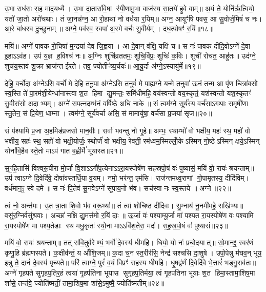 उ॒भा राध॑सः स॒ह मा॑द॒यध्यै। उ॒भा दा॒तारा॑वि॒षा र॑यी॒णामु॒भा वाज॑स्य सा॒तये॑ हुवे वाम्॥ अ॒यं ते॒ योनि॑र्\mbox{}ऋ॒त्वियो॒ यतो॑ जा॒तो अरो॑चथाः। तं जा॒नन्न॑ग्न॒ आ रो॒हाथा॑ नो वर्धया र॒यिम्॥ अग्न॒ आयूꣳ॑षि पवस॒ आ सु॒वोर्ज॒मिषं॑ च नः। आ॒रे बा॑धस्व दु॒च्छुनाम्॥ अग्ने॒ पव॑स्व॒ स्वपा॑ अ॒स्मे वर्चः॑ सु॒वीर्यम्। दध॒त्पोषꣳ॑ र॒यिं॥१८॥

मयि॑॥ अग्ने॑ पावक रो॒चिषा॑ म॒न्द्रया॑ देव जि॒ह्वया। आ दे॒वान् व॑क्षि॒ यक्षि॑ च॥ स नः॑ पावक दीदि॒वोऽग्ने॑ दे॒वा इ॒हाऽऽव॑ह। उप॑ य॒ज्ञ ह॒विश्च॑ नः॥ अ॒ग्निः शुचि॑व्रततमः॒ शुचि॒र्विप्रः॒ शुचिः॑ क॒विः। शुची॑ रोचत॒ आहु॑तः॥ उद॑ग्ने॒ शुच॑य॒स्तव॑ शु॒क्रा भ्राज॑न्त ईरते। तव॒ ज्योतीꣳ॑ष्य॒र्चयः॑॥ आ॒यु॒र्दा अ॑ग्ने॒ऽस्यायु॑र्मे॥१९॥

दे॒हि॒ व॒र्चो॒दा अ॑ग्नेऽसि॒ वर्चो॑ मे देहि तनू॒पा अ॑ग्नेऽसि त॒नुवं॑ मे पा॒ह्यग्ने॒ यन्मे॑ त॒नुवा॑ ऊ॒नं तन्म॒ आ पृ॑ण॒ चित्रा॑वसो स्व॒स्ति ते॑ पा॒रम॑शी॒येन्धा॑नास्त्वा श॒त हिमा द्यु॒मन्तः॒ समि॑धीमहि॒ वय॑स्वन्तो वय॒स्कृतं॒ यश॑स्वन्तो यश॒स्कृतꣳ॑ सु॒वीरा॑सो॒ अदाभ्यम्। अग्ने॑ सपत्न॒दम्भ॑नं॒ वर्\mbox{}षि॑ष्ठे॒ अधि॒ नाके॥ सं त्वम॑ग्ने॒ सूर्य॑स्य॒ वर्च॑साऽगथाः॒ समृषी॑णा स्तु॒तेन॒ सं प्रि॒येण॒ धाम्ना। त्वम॑ग्ने॒ सूर्य॑वर्चा असि॒ सं मामायु॑षा॒ वर्च॑सा प्र॒जया॑ सृज॥२०॥

{\anuvakamend[{आ॒हु॒वध्यै॑ र॒यिं मे॒ वर्च॑सा स॒प्तद॑श च॥५॥}]}

सं प॑श्यामि प्र॒जा अ॒हमिड॑प्रजसो मान॒वीः। सर्वा॑ भवन्तु नो गृ॒हे॥ अम्भः॒ स्थाम्भो॑ वो भक्षीय॒ महः॑ स्थ॒ महो॑ वो भक्षीय॒ सहः॑ स्थ॒ सहो॑ वो भक्षी॒योर्जः॒ स्थोर्जं॑ वो भक्षीय॒ रेव॑ती॒ रम॑ध्वम॒स्मिल्लोँ॒केऽस्मिन् गो॒ष्ठेऽस्मिन् क्षये॒ऽस्मिन् योना॑वि॒हैव स्ते॒तो माऽप॑ गात ब॒ह्वीर्मे॑ भूयास्त॥२१॥

स॒ꣳ॒हि॒तासि॑ विश्वरू॒पीरा मो॒र्जा वि॒शाऽऽगौ॑प॒त्येनाऽऽरा॒यस्पोषे॑ण सहस्रपो॒षं वः॑ पुष्यासं॒ मयि॑ वो॒ रायः॑ श्रयन्ताम्॥ उप॑ त्वाऽग्ने दि॒वेदि॑वे॒ दोषा॑वस्तर्धि॒या व॒यम्। नमो॒ भर॑न्त॒ एम॑सि। राज॑न्तमध्व॒राणां गो॒पामृ॒तस्य॒ दीदि॑विम्। वर्ध॑मान॒ꣵ॒ स्वे दमे॥ स नः॑ पि॒तेव॑ सू॒नवेऽग्ने॑ सूपाय॒नो भ॑व। सच॑स्वा नः स्व॒स्तये॥ अग्ने॥२२॥

त्वं नो॒ अन्त॑मः। उ॒त त्रा॒ता शि॒वो भ॑व वरू॒थ्यः॑॥ तं त्वा॑ शोचिष्ठ दीदिवः। सु॒म्नाय॑ नू॒नमी॑महे॒ सखि॑भ्यः॥ वसु॑र॒ग्निर्वसु॑श्रवाः। अच्छा॑ नक्षि द्यु॒मत्त॑मो र॒यिं दाः॥ ऊ॒र्जा वः॑ पश्याम्यू॒र्जा मा॑ पश्यत रा॒यस्पोषे॑ण वः पश्यामि रा॒यस्पोषे॑ण मा पश्य॒तेडाः स्थ मधु॒कृतः॑ स्यो॒ना माऽऽवि॑श॒तेरा॒ मदः॑। स॒ह॒स्र॒पो॒षं वः॑ पुष्यासं॥२३॥

मयि॑ वो॒ रायः॑ श्रयन्ताम्॥ तत् स॑वि॒तुर्वरेण्यं॒ भर्गो॑ दे॒वस्य॑ धीमहि। धियो॒ यो नः॑ प्रचो॒दयात्॥ सो॒मान॒ꣵ॒ स्वर॑णं कृणु॒हि ब्र॑ह्मणस्पते। क॒क्षीव॑न्तं॒ य औ॑शि॒जम्॥ क॒दा च॒न स्त॒रीर॑सि॒ नेन्द्र॑ सश्चसि दा॒शुषे। उपो॒पेन्नु म॑घव॒न् भूय॒ इन्नु ते॒ दानं॑ दे॒वस्य॑ पृच्यते॥ परि॑ त्वाग्ने॒ पुरं॑ व॒यं विप्रꣳ॑ सहस्य धीमहि। धृ॒षद्व॑र्णं दि॒वेदि॑वे भे॒त्तारं॑ भङ्गु॒राव॑तः॥ अग्ने॑ गृहपते सुगृहप॒तिर॒हं त्वया॑ गृ॒हप॑तिना भूयास सुगृहप॒तिर्मया॒ त्वं गृ॒हप॑तिना भूयाः श॒त हिमा॒स्तामा॒शिष॒मा शा॑से॒ तन्त॑वे॒ ज्योति॑ष्मतीं॒ तामा॒शिष॒मा शा॑से॒ऽमुष्मै॒ ज्योति॑ष्मतीम्॥२४॥

